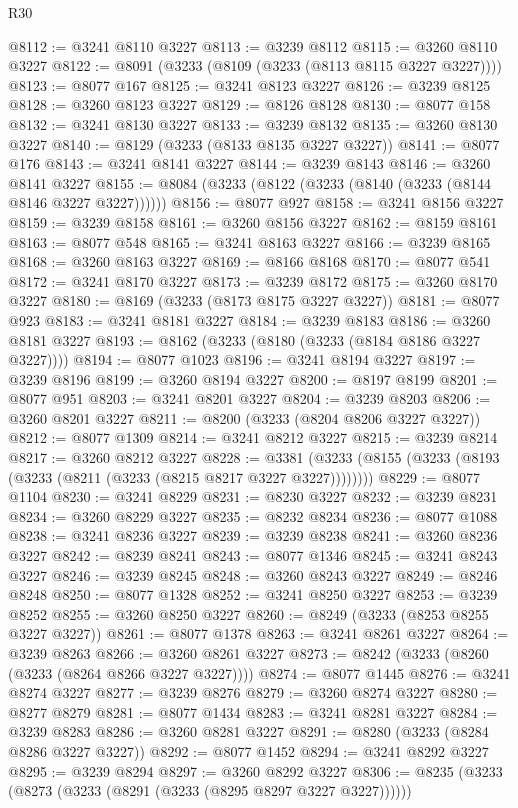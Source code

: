 \begin{lexlean}{R30}
\begin{coremodule}
@8112 := @3241 @8110 @3227
@8113 := @3239 @8112
@8115 := @3260 @8110 @3227
@8122 := @8091 (@3233 (@8109 (@3233 (@8113 @8115 @3227 @3227))))
@8123 := @8077 @167
@8125 := @3241 @8123 @3227
@8126 := @3239 @8125
@8128 := @3260 @8123 @3227
@8129 := @8126 @8128
@8130 := @8077 @158
@8132 := @3241 @8130 @3227
@8133 := @3239 @8132
@8135 := @3260 @8130 @3227
@8140 := @8129 (@3233 (@8133 @8135 @3227 @3227))
@8141 := @8077 @176
@8143 := @3241 @8141 @3227
@8144 := @3239 @8143
@8146 := @3260 @8141 @3227
@8155 := @8084 (@3233 (@8122 (@3233 (@8140 (@3233 (@8144 @8146 @3227 @3227))))))
@8156 := @8077 @927
@8158 := @3241 @8156 @3227
@8159 := @3239 @8158
@8161 := @3260 @8156 @3227
@8162 := @8159 @8161
@8163 := @8077 @548
@8165 := @3241 @8163 @3227
@8166 := @3239 @8165
@8168 := @3260 @8163 @3227
@8169 := @8166 @8168
@8170 := @8077 @541
@8172 := @3241 @8170 @3227
@8173 := @3239 @8172
@8175 := @3260 @8170 @3227
@8180 := @8169 (@3233 (@8173 @8175 @3227 @3227))
@8181 := @8077 @923
@8183 := @3241 @8181 @3227
@8184 := @3239 @8183
@8186 := @3260 @8181 @3227
@8193 := @8162 (@3233 (@8180 (@3233 (@8184 @8186 @3227 @3227))))
@8194 := @8077 @1023
@8196 := @3241 @8194 @3227
@8197 := @3239 @8196
@8199 := @3260 @8194 @3227
@8200 := @8197 @8199
@8201 := @8077 @951
@8203 := @3241 @8201 @3227
@8204 := @3239 @8203
@8206 := @3260 @8201 @3227
@8211 := @8200 (@3233 (@8204 @8206 @3227 @3227))
@8212 := @8077 @1309
@8214 := @3241 @8212 @3227
@8215 := @3239 @8214
@8217 := @3260 @8212 @3227
@8228 := @3381 (@3233 (@8155 (@3233 (@8193 (@3233 (@8211 (@3233 (@8215 @8217 @3227 @3227))))))))
@8229 := @8077 @1104
@8230 := @3241 @8229
@8231 := @8230 @3227
@8232 := @3239 @8231
@8234 := @3260 @8229 @3227
@8235 := @8232 @8234
@8236 := @8077 @1088
@8238 := @3241 @8236 @3227
@8239 := @3239 @8238
@8241 := @3260 @8236 @3227
@8242 := @8239 @8241
@8243 := @8077 @1346
@8245 := @3241 @8243 @3227
@8246 := @3239 @8245
@8248 := @3260 @8243 @3227
@8249 := @8246 @8248
@8250 := @8077 @1328
@8252 := @3241 @8250 @3227
@8253 := @3239 @8252
@8255 := @3260 @8250 @3227
@8260 := @8249 (@3233 (@8253 @8255 @3227 @3227))
@8261 := @8077 @1378
@8263 := @3241 @8261 @3227
@8264 := @3239 @8263
@8266 := @3260 @8261 @3227
@8273 := @8242 (@3233 (@8260 (@3233 (@8264 @8266 @3227 @3227))))
@8274 := @8077 @1445
@8276 := @3241 @8274 @3227
@8277 := @3239 @8276
@8279 := @3260 @8274 @3227
@8280 := @8277 @8279
@8281 := @8077 @1434
@8283 := @3241 @8281 @3227
@8284 := @3239 @8283
@8286 := @3260 @8281 @3227
@8291 := @8280 (@3233 (@8284 @8286 @3227 @3227))
@8292 := @8077 @1452
@8294 := @3241 @8292 @3227
@8295 := @3239 @8294
@8297 := @3260 @8292 @3227
@8306 := @8235 (@3233 (@8273 (@3233 (@8291 (@3233 (@8295 @8297 @3227 @3227))))))

\end{coremodule}
\end{lexlean}

